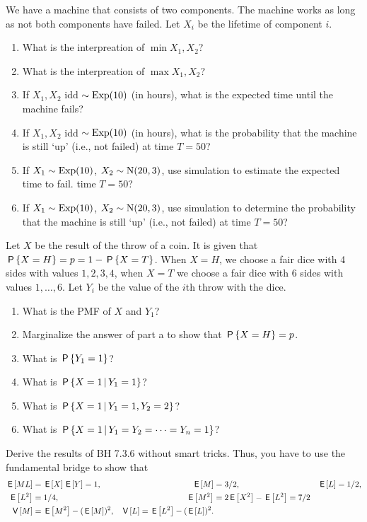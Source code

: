 \documentclass[a4paper]{article}
\begin{document}
\begin{exercise}
We have a machine that consists of two components. The machine works as long as not both components have failed. Let $X_i$ be the lifetime of component $i$. 
\begin{enumerate}
\item What is the interpreation of $\min{X_1, X_{2}}$?
\item What is the interpreation of $\max{X_1, X_{2}}$?
\item If $X_1, X_2$ idd $\sim \Exp{10}$ (in hours), what is the expected time until the machine fails? 
\item If $X_1, X_2$ idd $\sim \Exp{10}$ (in hours), what is the probability that the machine is still `up' (i.e., not failed) at time $T=50$? 
\item If $X_1\sim \Exp{10}$, $X_2 \sim \Norm{20, 3}$, use simulation to estimate the expected time to fail. time $T=50$? 
\item If $X_1\sim \Exp{10}$, $X_2 \sim \Norm{20, 3}$, use simulation to determine  the probability that the machine is still `up' (i.e., not failed) at time $T=50$? 
\end{enumerate}
\end{exercise}

\begin{exercise}
Let $X$ be the result of the throw of a coin.
It is given that $\P{X=H} = p = 1-\P{X=T}$.
When $X=H$, we choose a fair dice with 4 sides with values $1,2,3,4$, when $X=T$ we choose a fair dice with 6 sides with values $1,\ldots,6$.
Let $Y_i$ be the value of the $i$th throw with the dice.
\begin{enumerate}
\item What is the PMF of $X$ and $Y_1$?
\item Marginalize  the answer of part a to show that $\P{X=H} = p$. 
\item What is $\P{Y_{1}=1}$?
\item What is $\P{X=1 \given Y_1=1}$?
\item What is $\P{X=1 \given Y_1=1, Y_2=2}$?
\item What is $\P{X=1 \given Y_1=Y_2=\cdots=Y_n = 1}$?
\end{enumerate}
\end{exercise}


\begin{exercise}
Derive the results of BH 7.3.6 without smart tricks. Thus, you have to use the fundamental bridge to show that 
\begin{align*}
\E{M L} &= \E X \E Y = 1, & \E{M} &= 3/2, & \E L &= 1/2, \\
\E{L^{2}} &=  1/4, & \E{M^{2}} &= 2\E{X^{2}} - \E{L^{2}} = 7/2 \\ 
\V{M}&=\E{M^2} - (\E M)^{2}, & \V L = \E{L^2}-(\E L)^2.
\end{align*}
\end{exercise}
\end{document}
